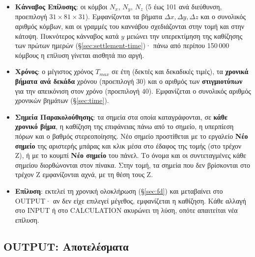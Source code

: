 \documentclass[11pt,a4paper]{article}
\begin{document}
\begin{itemize}
  \item \textbf{Κάνναβος Επίλυσης}: οι κόμβοι $N_x$, $N_y$, $N_z$ (5 έως 101 ανά διεύθυνση, προεπιλογή $31 \times 81 \times 31$). Εμφανίζονται τα βήματα $\Delta x, \Delta y, \Delta z$ και ο συνολικός αριθμός κόμβων, και οι γραμμές του καννάβου σχεδιάζονται στην τομή και στην κάτοψη. Πυκνότερος κάνναβος κατά $y$ μειώνει την υπερεκτίμηση της καθίζησης των πρώτων ημερών (§\ref{sec:settlement-time})· πάνω από περίπου 150\,000 κόμβους η επίλυση γίνεται αισθητά πιο αργή.
  \item \textbf{Χρόνος}: ο μέγιστος χρόνος $T_{max}$ σε έτη (δεκτές και δεκαδικές τιμές), τα \textbf{χρονικά βήματα ανά δεκάδα} χρόνου (προεπιλογή 30) και ο αριθμός των \textbf{στιγμιοτύπων} για την απεικόνιση στον χρόνο (προεπιλογή 40). Εμφανίζεται ο συνολικός αριθμός χρονικών βημάτων (§\ref{sec:time}).
  \item \textbf{Σημεία Παρακολούθησης}: τα σημεία στα οποία καταγράφονται, σε \textbf{κάθε χρονικό βήμα}, η καθίζηση της επιφάνειας πάνω από το σημείο, η υπερπίεση πόρων και ο βαθμός στερεοποίησης. Νέο σημείο προστίθεται με το εργαλείο \textbf{Νέο σημείο} της αριστερής μπάρας και κλικ μέσα στο έδαφος της τομής (στο τρέχον Z), ή με το κουμπί \textbf{Νέο σημείο} του πάνελ. Το όνομα και οι συντεταγμένες κάθε σημείου διορθώνονται στον πίνακα. Στην τομή, τα σημεία που δεν βρίσκονται στο τρέχον Z εμφανίζονται αχνά, με τη θέση τους Z.
  \item \textbf{Επίλυση}: εκτελεί τη χρονική ολοκλήρωση (§\ref{sec:fd}) και μεταβαίνει στο OUTPUT· αν δεν είχε επιλεγεί μέγεθος, εμφανίζεται η καθίζηση. Κάθε αλλαγή στο INPUT ή στο CALCULATION ακυρώνει τη λύση, οπότε απαιτείται νέα επίλυση.
\end{itemize}

\subsection{OUTPUT: Αποτελέσματα}
\end{document}
